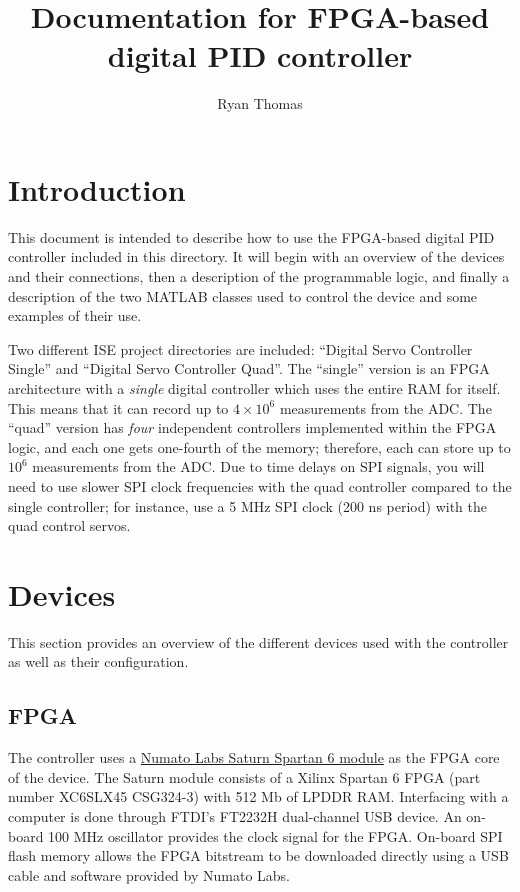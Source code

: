 \documentclass{article}
\begin{document}
\title{Documentation for FPGA-based digital PID controller}
\author{Ryan Thomas}

\maketitle

\section{Introduction}
This document is intended to describe how to use the FPGA-based digital PID controller included in this directory.  It will begin with an overview of the devices and their connections, then a description of the programmable logic, and finally a description of the two MATLAB classes used to control the device and some examples of their use.

Two different ISE project directories are included: ``Digital Servo Controller Single'' and ``Digital Servo Controller Quad''.  The ``single'' version is an FPGA architecture with a \emph{single} digital controller which uses the entire RAM for itself.  This means that it can record up to $4\times 10^6$ measurements from the ADC.  The ``quad'' version has \emph{four} independent controllers implemented within the FPGA logic, and each one gets one-fourth of the memory; therefore, each can store up to $10^6$ measurements from the ADC.  Due to time delays on SPI signals, you will need to use slower SPI clock frequencies with the quad controller compared to the single controller; for instance, use a 5 MHz SPI clock (200 ns period) with the quad control servos.  

\section{Devices}
\label{sec:Devices}
This section provides an overview of the different devices used with the controller as well as their configuration.

\subsection{FPGA}
\label{ssec:FPGA}
The controller uses a \href{https://numato.com/product/saturn-spartan-6-fpga-development-board-with-ddr-sdram}{Numato Labs Saturn Spartan 6 module} as the FPGA core of the device.  The Saturn module consists of a Xilinx Spartan 6 FPGA (part number XC6SLX45 CSG324-3) with 512 Mb of LPDDR RAM.  Interfacing with a computer is done through FTDI’s FT2232H dual-channel USB device.  An on-board 100 MHz oscillator provides the clock signal for the FPGA.  On-board SPI flash memory allows the FPGA bitstream to be downloaded directly using a USB cable and software provided by Numato Labs.
\end{document}
